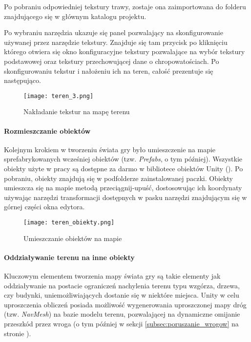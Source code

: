     Po pobraniu odpowiedniej tekstury trawy, zostaje ona zaimportowana do folderu  znajdującego się w głównym katalogu projektu.

    Po wybraniu narzędzia  ukazuje się panel  pozwalający na skonfigurowanie używanej przez narzędzie tekstury. Znajduje się tam przycisk  po kliknięciu którego otwiera się okno konfiguracyjne tekstury pozwalające na wybór tekstury podstawowej oraz tekstury przechowującej dane o chropowatościach. Po skonfigurowaniu tekstur i nałożeniu ich na teren, całość prezentuje się następująco.

    \begin{figure}[H]
    \texttt{[image: teren\_3.png]}
    \caption{Nakładanie tekstur na mapę terenu}
    \end{figure}

\paragraph{Rozmieszczanie obiektów}

    Kolejnym krokiem w tworzeniu świata gry było umieszczenie na mapie sprefabrykowanych wcześniej obiektów (tzw. \textit{Prefabs}, o tym później). Wszystkie obiekty użyte w pracy są dostępne za darmo w bibliotece obiektów Unity (). Po pobraniu, obiekty znajdują się w podfolderze  zainstalowanej paczki. Obiekty umieszcza się na mapie metodą przeciągnij-upuść, dostosowując ich koordynaty używając narzędzi transformacji dostępnych w pasku narzędzi znajdującym się w górnej części okna edytora.

    \begin{figure}[H]
    \texttt{[image: teren\_obiekty.png]}
    \caption{Umieszczanie obiektów na mapie}
    \end{figure}


\paragraph{Oddziaływanie terenu na inne obiekty}

    Kluczowym elementem tworzenia mapy świata gry są takie elementy jak oddziaływanie na postacie ograniczeń nachylenia terenu typu wzgórza, drzewa, czy budynki, uniemożliwiających dostanie się w niektóre miejsca. Unity w celu uproszczenia obliczeń posiada możliwość wygenerowania uproszczonej mapy dróg (tzw. \textit{NavMesh}) na bazie modelu terenu, pozwalającej na dynamiczne omijanie przeszkód przez wroga (o tym później w sekcji \ref{subsec:poruszanie_wrogow} na stronie \pageref{subsec:poruszanie_wrogow}).

